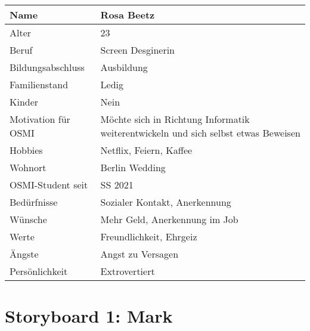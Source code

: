 \documentclass{article}
\begin{document}
\begin{center}
	\begin{tabularx}{\textwidth}{|l|X|}
		\hline
		Name                & Rosa Beetz                                          \\
		\hline
		Alter               & 23                                                  \\
		\hline
		Beruf               & Screen Desginerin                                   \\
		\hline
		Bildungsabschluss   & Ausbildung                                          \\
		\hline
		Familienstand       & Ledig                                               \\
		\hline
		Kinder              & Nein                                                \\
		\hline
		Motivation für OSMI & Möchte sich in Richtung Informatik weiterentwickeln
		und sich selbst etwas Beweisen                                            \\
		\hline
		Hobbies             & Netflix, Feiern, Kaffee                             \\
		\hline
		Wohnort             & Berlin Wedding                                      \\
		\hline
		OSMI-Student seit   & SS 2021                                             \\
		\hline
		Bedürfnisse         & Sozialer Kontakt, Anerkennung                       \\
		\hline
		Wünsche             & Mehr Geld, Anerkennung im Job                       \\
		\hline
		Werte               & Freundlichkeit, Ehrgeiz                             \\
		\hline
		Ängste              & Angst zu Versagen                                   \\
		\hline
		Persönlichkeit      & Extrovertiert                                       \\
		\hline
	\end{tabularx}
\end{center}



\newpage

\section{Storyboard 1: Mark}
\end{document}
